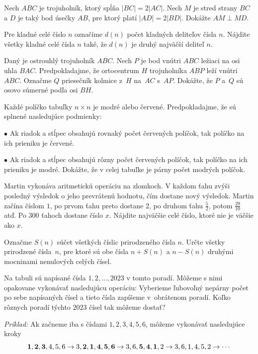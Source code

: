 {%
Nech $ABC$ je trojuholník, ktorý spĺňa $|BC|=2|AC|$. Nech $M$ je stred strany $BC$ a $D$ je taký bod úsečky $AB$, pre ktorý platí $|AD|=2|BD|$. Dokážte $AM \perp MD$.}

{%
Pre kladné celé číslo $n$ označíme $d(n)$ počet kladných deliteľov čísla $n$. Nájdite všetky kladné celé čísla $n$ také, že $d(n)$ je druhý najväčší deliteľ $n$.}

{%
Daný je ostrouhlý trojuholník $ABC$. Nech $P$ je bod vnútri $ABC$ ležiaci na osi uhla $BAC$. Predpokladajme, že ortocentrum $H$ trojuholníka $ABP$ leží vnútri $ABC$. Označme $Q$ priesečník kolmice z~$H$ na~$AC$ s~$AP$. Dokážte, že $P$ a~$Q$ sú osovo súmerné podľa osi $BH$.}

{%
Každé políčko tabuľky $n\times n$ je modré alebo červené. Predpokladajme, že sú splnené nasledujúce podmienky:
\item{$\bullet$} Ak riadok a stĺpec obsahujú rovnaký počet červených políčok, tak políčko na ich prieniku je červené.
\item{$\bullet$} Ak riadok a stĺpec obsahujú rôzny počet červených políčok, tak políčko na ich prieniku je modré.\endgraf\noindent
Dokážte, že v celej tabuľke je párny počet modrých políčok.}

{%
Martin vykonáva aritmetickú operáciu na zlomkoch. V každom ťahu zvýši posledný výsledok o jeho prevrátenú hodnotu, čím dostane nový výsledok. Martin začína číslom $1$, po prvom ťahu preto dostane $2$, po druhom ťahu $\frac52$, potom $\frac{29}{10}$ atď. Po $300$ ťahoch dostane číslo $x$. Nájdite najväčšie celé číslo, ktoré nie je väčšie ako $x$.}

{%
Označme $S(n)$ súčet všetkých číslic prirodzeného čísla $n$. Určte všetky prirodzené čísla~$n$, pre ktoré sú obe čísla $n+S(n)$ a $n-S(n)$ druhými mocninami nenulových celých čísel.}

{%
Na tabuli sú napísané čísla $1,2,\ldots,2023$ v tomto poradí. Môžeme s nimi opakovane vykonávať nasledujúcu operáciu: Vyberieme ľubovoľný nepárny počet po sebe napísaných čísel a tieto čísla zapíšeme v~obrátenom poradí. Koľko rôznych poradí týchto $2023$ čísel tak môžeme dostať?

\emph{Príklad:} Ak začneme iba s číslami $1,2,3,4,5,6$, môžeme vykonávať nasledujúce kroky
 $$\bold{1},\bold{2},\bold{3},4,5,6 \rightarrow 3,\bold2,\bold1,\bold4,\bold5,\bold6 \rightarrow 3,6,\bold5,\bold4,\bold1,2 \rightarrow 3,6,1,4,5,2 \rightarrow \cdots$$}

